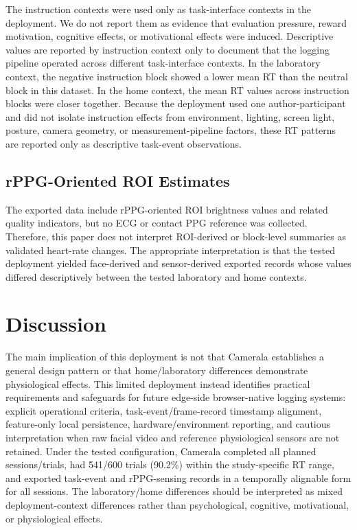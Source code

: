 \documentclass[dvipdfmx]{ehis}
\begin{document}
The instruction contexts were used only as task-interface contexts in the deployment.
We do not report them as evidence that evaluation pressure, reward motivation, cognitive effects, or motivational effects were induced.
Descriptive values are reported by instruction context only to document that the logging pipeline operated across different task-interface contexts.
In the laboratory context, the negative instruction block showed a lower mean RT than the neutral block in this dataset.
In the home context, the mean RT values across instruction blocks were closer together.
Because the deployment used one author-participant and did not isolate instruction effects from environment, lighting, screen light, posture, camera geometry, or measurement-pipeline factors, these RT patterns are reported only as descriptive task-event observations.

\subsection{rPPG-Oriented ROI Estimates}
The exported data include rPPG-oriented ROI brightness values and related quality indicators, but no ECG or contact PPG reference was collected.
Therefore, this paper does not interpret ROI-derived or block-level summaries as validated heart-rate changes.
The appropriate interpretation is that the tested deployment yielded face-derived and sensor-derived exported records whose values differed descriptively between the tested laboratory and home contexts.

\section{Discussion}

The main implication of this deployment is not that Camerala establishes a general design pattern or that home/laboratory differences demonstrate physiological effects.
This limited deployment instead identifies practical requirements and safeguards for future edge-side browser-native logging systems: explicit operational criteria, task-event/frame-record timestamp alignment, feature-only local persistence, hardware/environment reporting, and cautious interpretation when raw facial video and reference physiological sensors are not retained.
Under the tested configuration, Camerala completed all planned sessions/trials, had 541/600 trials (90.2\%) within the study-specific RT range, and exported task-event and rPPG-sensing records in a temporally alignable form for all sessions.
The laboratory/home differences should be interpreted as mixed deployment-context differences rather than psychological, cognitive, motivational, or physiological effects.
\end{document}
